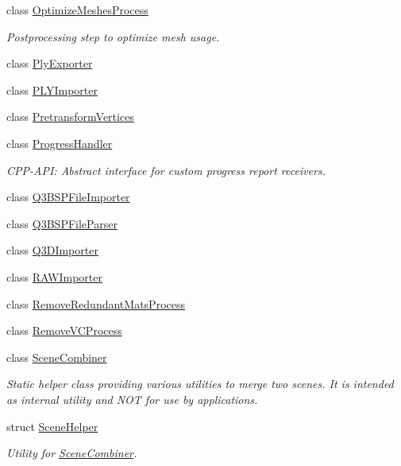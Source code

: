 \begin{DoxyCompactItemize}
class \hyperlink{class_assimp_1_1_optimize_meshes_process}{Optimize\+Meshes\+Process}
\begin{DoxyCompactList}\small\item\em Postprocessing step to optimize mesh usage. \end{DoxyCompactList}\item 
class \hyperlink{class_assimp_1_1_ply_exporter}{Ply\+Exporter}
\item 
class \hyperlink{class_assimp_1_1_p_l_y_importer}{P\+L\+Y\+Importer}
\item 
class \hyperlink{class_assimp_1_1_pretransform_vertices}{Pretransform\+Vertices}
\item 
class \hyperlink{class_assimp_1_1_progress_handler}{Progress\+Handler}
\begin{DoxyCompactList}\small\item\em C\+P\+P-\/\+A\+P\+I\+: Abstract interface for custom progress report receivers. \end{DoxyCompactList}\item 
class \hyperlink{class_assimp_1_1_q3_b_s_p_file_importer}{Q3\+B\+S\+P\+File\+Importer}
\item 
class \hyperlink{class_assimp_1_1_q3_b_s_p_file_parser}{Q3\+B\+S\+P\+File\+Parser}
\item 
class \hyperlink{class_assimp_1_1_q3_d_importer}{Q3\+D\+Importer}
\item 
class \hyperlink{class_assimp_1_1_r_a_w_importer}{R\+A\+W\+Importer}
\item 
class \hyperlink{class_assimp_1_1_remove_redundant_mats_process}{Remove\+Redundant\+Mats\+Process}
\item 
class \hyperlink{class_assimp_1_1_remove_v_c_process}{Remove\+V\+C\+Process}
\item 
class \hyperlink{class_assimp_1_1_scene_combiner}{Scene\+Combiner}
\begin{DoxyCompactList}\small\item\em Static helper class providing various utilities to merge two scenes. It is intended as internal utility and N\+O\+T for use by applications. \end{DoxyCompactList}\item 
struct \hyperlink{struct_assimp_1_1_scene_helper}{Scene\+Helper}
\begin{DoxyCompactList}\small\item\em Utility for \hyperlink{class_assimp_1_1_scene_combiner}{Scene\+Combiner}. \end{DoxyCompactList}\item 

\end{DoxyCompactItemize}
